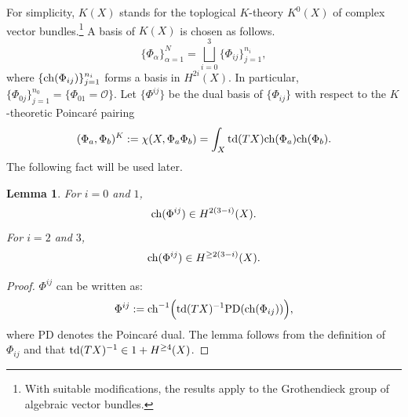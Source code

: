 \documentclass[11pt]{amsart}
\newtheorem{lemma}[theorem]{Lemma}
\newtheorem{conjecture}[theorem]{Conjecture}
\newtheorem*{main theorem*}{Main Theorem}
\theoremstyle{remark}
\numberwithin{equation}{section}
\newcommand{\td}{{\rm td}}
\newcommand{\ch}{{\rm ch}}
\newcommand{\GV}{{\mathrm{GV}}}
\begin{document}
For simplicity, $K(X)$ stands for the toplogical $K$-theory $K^0(X)$ of complex vector bundles.\footnote{With suitable modifications, the results apply to the Grothendieck group of algebraic vector bundles.} A basis of $K(X)$ is chosen as follows.
\[
\{
\Phi_{\alpha}
\}_{\alpha=1}^N =  \bigsqcup_{i=0}^3 \{ \Phi_{ij}\}_{j=1}^{n_i},
\]
where $\{ \ch ( \Phi_{ij} )\}_{j=1}^{n_i}$ forms a basis in $H^{2i}(X)$. In particular, $\{ \Phi_{0j} \}_{j=1}^{n_0} = \{ \Phi_{01} =\mathcal{O} \}$. Let $\{ \Phi^{ij} \}$ be the dual basis of $\{ \Phi_{ij} \}$ with respect to the $K$-theoretic Poincar\'e pairing
\[
(\Phi_a, \Phi_b)^{K} : = \chi (X, \Phi_a \Phi_b) = \int_X \td(TX)\ch(\Phi_a)\ch(\Phi_b).
\]
The following fact will be used later.
\begin{lemma} \label{lemma_degPhi}
For $i = 0$ and $1$,
\[ 
\ch( \Phi^{ij} ) \in H^{2(3-i)}(X).
\]
For $i=2$ and $3$,
\[
\ch ( \Phi^{ij}) \in H^{ \geq 2(3-i)} (X).
\]
\end{lemma}
\begin{proof}
$\Phi^{ij}$ can be written as:
\[
\Phi^{ij}:= \ch^{-1} \Big(  \td(TX)^{-1} {\rm PD} (\ch (\Phi_{ij})) \Big), 
\]
where PD denotes the Poincar\'e dual. The lemma follows from the definition of $\Phi_{ij}$ and that $\td(TX)^{-1} \in 1 + H^{\geq 4}(X)$.
\end{proof}

\end{document}
